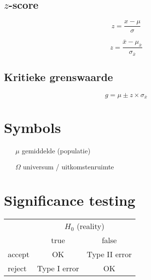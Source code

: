 \documentclass[a4paper]{article}
\begin{document}
\subsection{$z$-score}

\begin{equation}
z = \frac{x- \mu}{\sigma}
\end{equation}

\begin{equation}
z = \frac{\bar{x} - \mu_{\bar{x}}}{\sigma_{\bar{x}}}
\end{equation}

\subsection{Kritieke grenswaarde}

\begin{equation}
g = \mu \pm z \times \sigma_{\bar{x}}
\end{equation}

\section{Symbols}

\begin{itemize}
\item[$\mu$] gemiddelde (populatie)
\item[$\Omega$] universum / uitkomstenruimte
\end{itemize}

\section{Significance testing}

\begin{tabular}{l|c|c}
& \multicolumn{2}{c}{$H_{0}$ (reality)} \\
& true & false \\ \hline
accept & OK & Type II error \\
reject & Type I error & OK \\
\end{tabular}

\onecolumn
\end{document}
